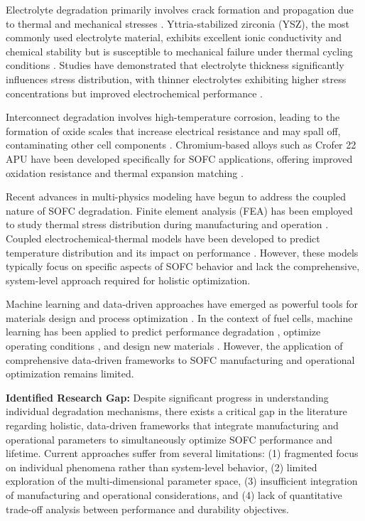 \documentclass[conference]{IEEEtran}
\begin{document}
Electrolyte degradation primarily involves crack formation and propagation due to thermal and mechanical stresses \cite{Atkinson2004}. Yttria-stabilized zirconia (YSZ), the most commonly used electrolyte material, exhibits excellent ionic conductivity and chemical stability but is susceptible to mechanical failure under thermal cycling conditions \cite{Selimovic2005}. Studies have demonstrated that electrolyte thickness significantly influences stress distribution, with thinner electrolytes exhibiting higher stress concentrations but improved electrochemical performance \cite{Nakajo2012}.

Interconnect degradation involves high-temperature corrosion, leading to the formation of oxide scales that increase electrical resistance and may spall off, contaminating other cell components \cite{Yang2003}. Chromium-based alloys such as Crofer 22 APU have been developed specifically for SOFC applications, offering improved oxidation resistance and thermal expansion matching \cite{Quadakkers2003}.

Recent advances in multi-physics modeling have begun to address the coupled nature of SOFC degradation. Finite element analysis (FEA) has been employed to study thermal stress distribution during manufacturing and operation \cite{Lin2009}. Coupled electrochemical-thermal models have been developed to predict temperature distribution and its impact on performance \cite{Andersson2011}. However, these models typically focus on specific aspects of SOFC behavior and lack the comprehensive, system-level approach required for holistic optimization.

Machine learning and data-driven approaches have emerged as powerful tools for materials design and process optimization \cite{Butler2018}. In the context of fuel cells, machine learning has been applied to predict performance degradation \cite{Polverino2021}, optimize operating conditions \cite{Zaccaria2016}, and design new materials \cite{Raccuglia2016}. However, the application of comprehensive data-driven frameworks to SOFC manufacturing and operational optimization remains limited.

\textbf{Identified Research Gap:} Despite significant progress in understanding individual degradation mechanisms, there exists a critical gap in the literature regarding holistic, data-driven frameworks that integrate manufacturing and operational parameters to simultaneously optimize SOFC performance and lifetime. Current approaches suffer from several limitations: (1) fragmented focus on individual phenomena rather than system-level behavior, (2) limited exploration of the multi-dimensional parameter space, (3) insufficient integration of manufacturing and operational considerations, and (4) lack of quantitative trade-off analysis between performance and durability objectives.
\end{document}
